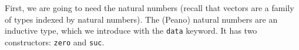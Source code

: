 First, we are going to need the natural numbers (recall that vectors are a family of types indexed by natural numbers).
The (Peano) natural numbers are an inductive type, which we introduce with the \texttt{data} keyword.
It has two constructors: \texttt{zero} and \texttt{suc}.
\begin{code}%
\>[0]\AgdaSpace{}%
\AgdaSpace{}%
\AgdaSymbol{:}\AgdaSpace{}%
\AgdaSpace{}%
\<%
\\
\>[0][@{}l@{\AgdaIndent{0}}]%
\>[2]\AgdaSpace{}%
\AgdaSymbol{:}\AgdaSpace{}%
\<%
\\
%
\>[2]\AgdaSpace{}%
\AgdaSymbol{:}\AgdaSpace{}%
\AgdaSpace{}%
\AgdaSpace{}%
\<%
\end{code}
\begin{code}[hide]%
\>[0]\AgdaOperator{\AgdaFunction{\AgdaUnderscore{}+\AgdaUnderscore{}}}\AgdaSpace{}%
\AgdaSymbol{:}\AgdaSpace{}%
\AgdaSpace{}%
\AgdaSpace{}%
\AgdaSpace{}%
\AgdaSpace{}%
\<%
\\
\>[0]\AgdaSpace{}%
\AgdaOperator{\AgdaFunction{+}}\AgdaSpace{}%
\AgdaSpace{}%
\AgdaSymbol{=}\AgdaSpace{}%
\<%
\\
\>[0]\AgdaSpace{}%
\AgdaSpace{}%
\AgdaOperator{\AgdaFunction{+}}\AgdaSpace{}%
\AgdaSpace{}%
\AgdaSymbol{=}\AgdaSpace{}%
\AgdaSpace{}%
\AgdaSymbol{(}\AgdaSpace{}%
\AgdaOperator{\AgdaFunction{+}}\AgdaSpace{}%
\AgdaSymbol{)}\<%
\\
%
\\[\AgdaEmptyExtraSkip]%
\>[0]\AgdaSpace{}%
\AgdaSpace{}%
\<%
\end{code}


